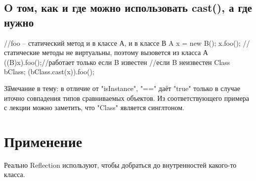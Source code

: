 \subsection{O том, как и где можно использовать cast(), а где нужно}
\begin{javacode}

//foo -- статический метод и в классе А, и в классе В
A x = new B();
x.foo(); //статические методы не виртуальны, поэтому вызовется из класса А
((B)x).foo();//работает только если B известен
//если B неизвестен
Class bClass;
(bClass.cast(x)).foo();
\end{javacode}

\t{Замечание в тему:} в отличие от \java"isInstance", \java"==" даёт \java"true" только в случае иточно совпадения типов сравниваемых объектов. 
Из соответствующего примера с лекции можно заметить, что \java"Class" является синглтоном.

\section{Применение}
Реально Reflection используют, чтобы добраться до внутренностей какого-то класса.

